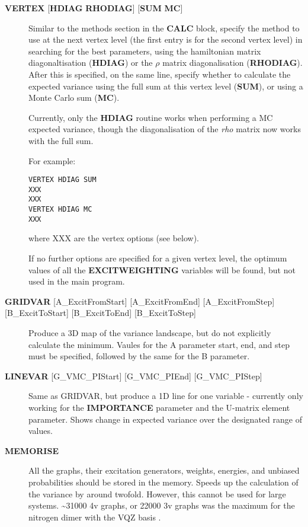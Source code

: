 \documentclass[openany,a4paper,10pt]{manual}
\begin{document}
\begin{description}
\item[\textbf{VERTEX} {[}\textbf{HDIAG} \textbf{RHODIAG}{]} {[}\textbf{SUM} \textbf{MC}{]}]
Similar to the methods section in the \textbf{CALC} block, specify the
method to use at the next vertex level (the first entry is for the
second vertex level) in searching for the best parameters, using the
hamiltonian matrix diagonaltisation (\textbf{HDIAG}) or the $\rho$
matrix diagonalisation (\textbf{RHODIAG}). After this is specified, on
the same line, specify whether to calculate the expected variance
using the full sum at this vertex level (\textbf{SUM}), or using a Monte
Carlo sum (\textbf{MC}).

Currently, only the \textbf{HDIAG} routine works when performing a MC
expected variance, though the diagonalisation of the \emph{rho} matrix
now works with the full sum.

For example:

\begin{Verbatim}[commandchars=@\[\]]
VERTEX HDIAG SUM
XXX
XXX
VERTEX HDIAG MC
XXX
\end{Verbatim}

where XXX are the vertex options (see below).

If no further options are specified for a given vertex level, the
optimum values of all the \textbf{EXCITWEIGHTING} variables will be found,
but not used in the main program.

\item[\textbf{GRIDVAR} {[}A\_ExcitFromStart{]} {[}A\_ExcitFromEnd{]} {[}A\_ExcitFromStep{]} {[}B\_ExcitToStart{]} {[}B\_ExcitToEnd{]} {[}B\_ExcitToStep{]}]
Produce a 3D map of the variance landscape, but do not explicitly
calculate the minimum. Vaules for the A parameter start, end, and
step must be specified, followed by the same for the B parameter.

\item[\textbf{LINEVAR} {[}G\_VMC\_PIStart{]} {[}G\_VMC\_PIEnd{]} {[}G\_VMC\_PIStep{]}]
Same as GRIDVAR, but produce a 1D line for one variable - currently
only working for the \textbf{IMPORTANCE} parameter and the U-matrix element
parameter. Shows change in expected variance over the designated range
of values.

\item[\textbf{MEMORISE}]
All the graphs, their excitation generators, weights, energies, and
unbiased probabilities should be stored in the memory.  Speeds up
the calculation of the variance by around twofold. However, this
cannot be used for large systems.  \textasciitilde{}31000 4v graphs, or 22000 3v
graphs was the maximum for the nitrogen dimer with the VQZ basis .


\end{description}
\end{document}
